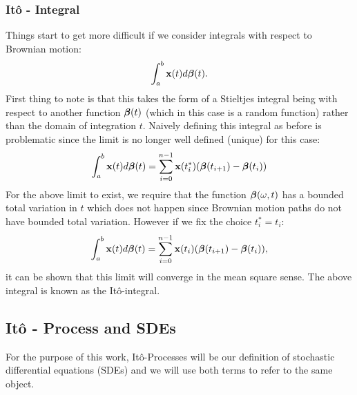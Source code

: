 \documentclass[a4paper,12pt,twoside,openright]{report}
\theoremstyle{definition}
\begin{document}
\subsubsection{Itô  - Integral}
Things start to get more difficult if we consider integrals with respect to Brownian motion:
\begin{align}\label{eq:brownian_integral}
    \int_{a}^b {\mathbf{x}}(t) d{\bm{\beta}}(t).
\end{align}
First thing to note is that this takes the form of a Stieltjes integral being with respect to another function ${\bm{\beta}}(t)$ (which in this case is a random function) rather than the domain of integration $t$. Naively defining this integral as before is problematic since the limit is no longer well defined (unique) for this case:
\begin{align}\label{eq:brownian_integral_bad}
    \int_{a}^b {\mathbf{x}}(t) d{\bm{\beta}}(t) = \sum_{i=0}^{n-1} {\mathbf{x}}(t^{*}_i)({\bm{\beta}}(t_{i+1}) - {\bm{\beta}}(t_i))
\end{align}
For the above limit to exist, we require that the function ${\bm{\beta}}(\omega, t)$ has a bounded total variation in $t$ which does not happen since Brownian motion paths do not have bounded total variation. However if we fix the choice $t_i^{*} = t_i$:
\begin{align}\label{eq:ito_integral}
    \int_{a}^b {\mathbf{x}}(t) d{\bm{\beta}}(t) = \sum_{i=0}^{n-1} {\mathbf{x}}(t_i)({\bm{\beta}}(t_{i+1}) - {\bm{\beta}}(t_i)),
\end{align}
it can be shown that this limit will converge in the mean square sense. The above integral is known as the Itô-integral.
\subsection{Itô  - Process and SDEs}

For the purpose of this work, Itô-Processes will be our definition of stochastic differential equations (SDEs) and we will use both terms to refer to the same object.
\end{document}
